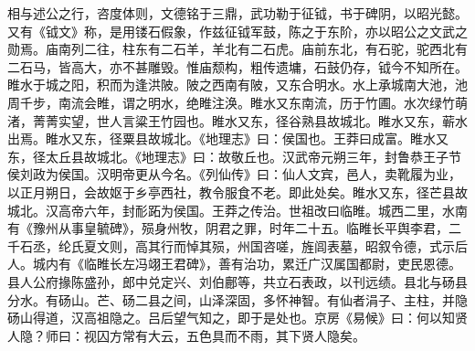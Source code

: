 \documentclass[12pt,UTF8]{ctexbook}
\begin{document}
相与述公之行，咨度体则，文德铭于三鼎，武功勒于征钺，书于碑阴，以昭光懿。又有《钺文》称，是用镂石假象，作兹征钺军鼓，陈之于东阶，亦以昭公之文武之勋焉。庙南列二往，柱东有二石羊，羊北有二石虎。庙前东北，有石驼，驼西北有二石马，皆高大，亦不甚雕毁。惟庙颓构，粗传遗墉，石鼓仍存，钺今不知所在。睢水于城之阳，积而为逢洪陂。陂之西南有陂，又东合明水。水上承城南大池，池周千步，南流会睢，谓之明水，绝睢注涣。睢水又东南流，历于竹圃。水次绿竹萌渚，菁菁实望，世人言粱王竹园也。睢水又东，径谷熟县故城北。睢水又东，蕲水出焉。睢水又东，径粟县故城北。《地理志》曰：侯国也。王莽曰成富。睢水又东，径太丘县故城北。《地理志》曰：故敬丘也。汉武帝元朔三年，封鲁恭王子节侯刘政为侯国。汉明帝更从今名。《列仙传》曰：仙人文宾，邑人，卖靴履为业，以正月朔日，会故妪于乡亭西社，教令服食不老。即此处矣。睢水又东，径芒县故城北。汉高帝六年，封耏跖为侯国。王莽之传治。世祖改曰临睢。城西二里，水南有《豫州从事皇毓碑》，殒身州牧，阴君之罪，时年二十五。临睢长平舆李君，二千石丞，纶氏夏文则，高其行而悼其殒，州国咨嗟，旌闾表墓，昭叙令德，式示后人。城内有《临睢长左冯翊王君碑》，善有治功，累迁广汉属国都尉，吏民恩德。县人公府掾陈盛孙，郎中兑定兴、刘伯鄜等，共立石表政，以刊远绩。县北与砀县分水。有砀山。芒、砀二县之间，山泽深固，多怀神智。有仙者涓子、主柱，并隐砀山得道，汉高祖隐之。吕后望气知之，即于是处也。京房《易候》曰：何以知贤人隐？师曰：视囚方常有大云，五色具而不雨，其下贤人隐矣。
\end{document}
